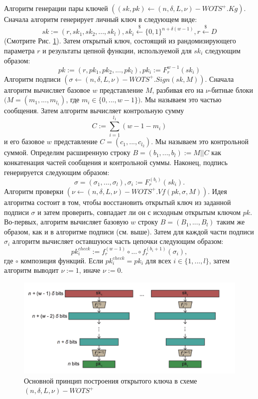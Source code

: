\documentclass[a4paper, 14pt]{extarticle}
\begin{document}
Алгоритм генерации пары ключей $((sk, pk) \leftarrow (n, \delta, L, \nu)-WOTS^{+}.Kg)$. Сначала алгоритм генерирует личный ключ в следующем виде:
\[sk := (r, sk_{1}, sk_{2}, ..., sk_{l}), sk_{i} \stackrel{\$}{\leftarrow} \{0, 1\}^{n+\delta(w - 1)}, r \stackrel{\$}{\leftarrow} D\]
(Смотрите Рис. \ref{fig:wots1}). Затем открытый ключ, состоящий из рандомизирующего параметра $r$ и результаты цепной функции, используемой для $sk_{i}$ следующим образом:
\[ pk := (r, pk_{1}, pk_{2}, ..., pk_{l}), pk_{i} := F^{w - 1}_{r}(sk_{i})\]
Алгоритм подписи $(\sigma \leftarrow (n, \delta, L, \nu)-WOTS^{+}.Sign(sk, M))$. Сначала алгоритм вычисляет базовое $w$ представление $M$, разбивая его на $\nu$-битные блоки $(M = (m_{1}, ..., m_{l_{1}})$, где $m_{i} \in \{0, ..., w - 1\})$. Мы называем это частью сообщения. Затем алгоритм вычисляет контрольную сумму
\[ C := \sum^{l_{1}}_{i = 1}(w - 1 - m_{i}) \]
и его базовое $w$ представление $C = (c_{1}, ..., c_{l_{2}})$. Мы называем это контрольной суммой. Определим расширенную строку $B = (b_{1}, ..., b_{l}) := M||C$ как конкатенация частей сообщения и контрольной суммы. Наконец, подпись генерируется следующим образом:
\[ \sigma = (\sigma_{1}, ..., \sigma_{l}), \sigma_{i} := F^{(b_{i})}_{r}(sk_{i}). \]
Алгоритм проверки $(\nu \leftarrow (n, \delta, L, \nu)-WOTS^{+}.Vf(pk, \sigma, M))$. Идея алгоритма состоит в том, чтобы восстановить открытый ключ из заданной подписи $\sigma$ и затем проверить, совпадает ли он с исходным открытым ключом $pk$. Во-первых, алгоритм вычисляет базовую $w$ строку $B = (B_{1}, ..., B_{l})$ таким же образом, как и в алгоритме подписи (см. выше). Затем для каждой части подписи $\sigma_{i}$ алгоритм вычисляет оставшуюся часть цепочки следующим образом:
\[pk^{check}_{i} := f^{(w - 1)}_{r} \circ ... \circ f^{(b_{i}+1)}_{r}(\sigma_{i}),\]
где $\circ$ композиция функций. Если $pk^{check}_{i} = pk_{i}$ для всех $i \in \{1, ..., l\}$, затем алгоритм выводит $\nu := 1$, иначе $\nu := 0$.
\begin{figure}[h]
    \centering
    \includegraphics[scale=0.7]{WOTS+_1.png}
    \caption{Основной принцип построения открытого ключа в схеме $(n, \delta, L, \nu)-WOTS^{+}$ }
    \label{fig:wots1}
\end{figure}
\end{document}
